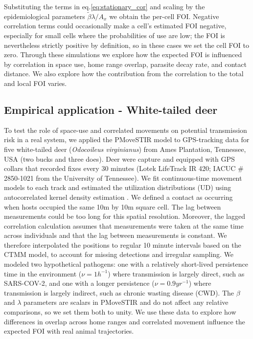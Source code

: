 \documentclass[letterpaper]{article}
\begin{document}
Substituting the terms in eq.\ref{eq:stationary_cor} and scaling by the epidemiological parameters $\tilde\beta\lambda/ A_x$ we obtain the per-cell FOI. 
Negative correlation terms could occasionally make a cell's estimated FOI negative, especially for small cells where the probabilities of use are low; the FOI is nevertheless strictly positive by definition, so in these cases we set the cell FOI to zero.
Through these simulations we explore how the expected FOI is influenced by correlation in space use, home range overlap, parasite decay rate, and contact distance. We also explore how the contribution from the correlation to the total and local FOI varies. 

\subsection*{Empirical application - White-tailed deer}

To test the role of space-use and correlated movements on potential transmission risk in a real system, we applied the PMoveSTIR model to GPS-tracking data for five white-tailed deer (\emph{Odocoileus virginianus}) from Ames Plantation, Tennessee, USA (two bucks and three does).%
Deer were capture and equipped with GPS collars that recorded fixes every 30 minutes (Lotek LifeTrack IR 420; IACUC \# 2850-1021 from the University of Tennessee).  We fit continuous-time movement models to each track and estimated the utilization distributions (UD) using autocorrelated kernel density estimation \citep{Calabrese2016}. We defined a contact as occurring when hosts occupied the same 10m by 10m square cell. The lag between measurements could be too long for this spatial resolution. Moreover, the lagged correlation calculation assumes that measurements were taken at the same time across individuals and that the lag between measurements is constant. We therefore interpolated the positions to regular 10 minute intervals based on the CTMM model, to account for missing detections and irregular sampling. 
We modeled two hypothetical pathogens: one with a relatively short-lived persistence time in the environment ($\nu=1 h^{-1}$) where transmission is largely direct, such as SARS-COV-2, and one with a longer persistence ($\nu=0.9 yr^{-1}$) where transmission is largely indirect, such as chronic wasting disease (CWD).  The $\beta$ and $\lambda$ parameters are scalars in PMoveSTIR and do not affect any relative comparisons, so we set them both to unity. 
We use these data to explore how differences in overlap across home ranges and  correlated movement influence the expected FOI with real animal trajectories.
\end{document}
